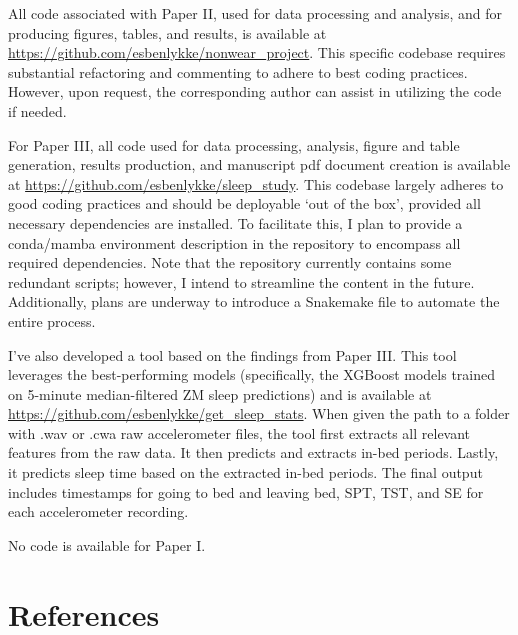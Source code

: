 \documentclass[
  10pt,
]{scrbook}
\begin{document}
All code associated with Paper II, used for data processing and
analysis, and for producing figures, tables, and results, is available
at \url{https://github.com/esbenlykke/nonwear_project}. This specific
codebase requires substantial refactoring and commenting to adhere to
best coding practices. However, upon request, the corresponding author
can assist in utilizing the code if needed.

For Paper III, all code used for data processing, analysis, figure and
table generation, results production, and manuscript pdf document
creation is available at
\url{https://github.com/esbenlykke/sleep_study}. This codebase largely
adheres to good coding practices and should be deployable `out of the
box', provided all necessary dependencies are installed. To facilitate
this, I plan to provide a conda/mamba environment description in the
repository to encompass all required dependencies. Note that the
repository currently contains some redundant scripts; however, I intend
to streamline the content in the future. Additionally, plans are
underway to introduce a Snakemake file to automate the entire process.

I've also developed a tool based on the findings from Paper III. This
tool leverages the best-performing models (specifically, the XGBoost
models trained on 5-minute median-filtered ZM sleep predictions) and is
available at \url{https://github.com/esbenlykke/get_sleep_stats}. When
given the path to a folder with .wav or .cwa raw accelerometer files,
the tool first extracts all relevant features from the raw data. It then
predicts and extracts in-bed periods. Lastly, it predicts sleep time
based on the extracted in-bed periods. The final output includes
timestamps for going to bed and leaving bed, SPT, TST, and SE for each
accelerometer recording.

No code is available for Paper I.

\hypertarget{references}{%
\chapter{References}\label{references}}
\end{document}

